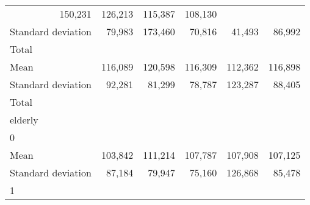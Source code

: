 \begin{tabular}{llllll}
  \multicolumn{1}{r}{150,231} &
  \multicolumn{1}{r}{126,213} &
  \multicolumn{1}{r}{115,387} &
  \multicolumn{1}{r}{108,130} \\
\multicolumn{1}{l}{\hspace{4em}Standard deviation} &
  \multicolumn{1}{|r}{79,983} &
  \multicolumn{1}{r}{173,460} &
  \multicolumn{1}{r}{70,816} &
  \multicolumn{1}{r}{41,493} &
  \multicolumn{1}{r}{86,992} \\
\multicolumn{1}{l}{\hspace{3em}Total} &
  \multicolumn{1}{|r}{} &
  \multicolumn{1}{r}{} &
  \multicolumn{1}{r}{} &
  \multicolumn{1}{r}{} &
  \multicolumn{1}{r}{} \\
\multicolumn{1}{l}{\hspace{4em}Mean} &
  \multicolumn{1}{|r}{116,089} &
  \multicolumn{1}{r}{120,598} &
  \multicolumn{1}{r}{116,309} &
  \multicolumn{1}{r}{112,362} &
  \multicolumn{1}{r}{116,898} \\
\multicolumn{1}{l}{\hspace{4em}Standard deviation} &
  \multicolumn{1}{|r}{92,281} &
  \multicolumn{1}{r}{81,299} &
  \multicolumn{1}{r}{78,787} &
  \multicolumn{1}{r}{123,287} &
  \multicolumn{1}{r}{88,405} \\
\multicolumn{1}{l}{\hspace{1em}Total} &
  \multicolumn{1}{|r}{} &
  \multicolumn{1}{r}{} &
  \multicolumn{1}{r}{} &
  \multicolumn{1}{r}{} &
  \multicolumn{1}{r}{} \\
\multicolumn{1}{l}{\hspace{2em}elderly} &
  \multicolumn{1}{|r}{} &
  \multicolumn{1}{r}{} &
  \multicolumn{1}{r}{} &
  \multicolumn{1}{r}{} &
  \multicolumn{1}{r}{} \\
\multicolumn{1}{l}{\hspace{3em}0} &
  \multicolumn{1}{|r}{} &
  \multicolumn{1}{r}{} &
  \multicolumn{1}{r}{} &
  \multicolumn{1}{r}{} &
  \multicolumn{1}{r}{} \\
\multicolumn{1}{l}{\hspace{4em}Mean} &
  \multicolumn{1}{|r}{103,842} &
  \multicolumn{1}{r}{111,214} &
  \multicolumn{1}{r}{107,787} &
  \multicolumn{1}{r}{107,908} &
  \multicolumn{1}{r}{107,125} \\
\multicolumn{1}{l}{\hspace{4em}Standard deviation} &
  \multicolumn{1}{|r}{87,184} &
  \multicolumn{1}{r}{79,947} &
  \multicolumn{1}{r}{75,160} &
  \multicolumn{1}{r}{126,868} &
  \multicolumn{1}{r}{85,478} \\
\multicolumn{1}{l}{\hspace{3em}1} &

\end{tabular}
